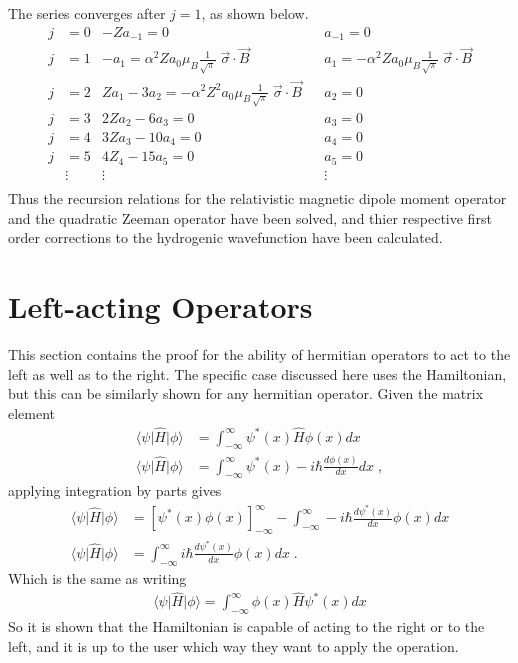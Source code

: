     \noindent The series converges after $j = 1$, as shown below.
    \begin{align*}
        j &= 0 & -Za_{-1} = 0& &a_{-1} = 0\\ \nonumber
        j &= 1 & -a_1 = \alpha^2 Z a_0 \mu_B  \frac{1}{\sqrt{\pi}}\; \vec{\sigma} \cdot \vec{B} & &a_{1} = - \alpha^2 Z a_0 \mu_B \frac{1}{\sqrt{\pi}}\; \vec{\sigma} \cdot \vec{B}\\ \nonumber
        j &= 2 & Za_1 - 3a_2 = - \alpha^2 Z^2 a_0 \mu_B \frac{1}{\sqrt{\pi}}\; \vec{\sigma} \cdot \vec{B} && a_2 = 0\\ \nonumber
        j &= 3 & 2Za_2 - 6a_3 = 0&& a_3 = 0\\ \nonumber
        j &= 4 & 3Za_3 - 10a_4 =0 && a_4 = 0\\ \nonumber
        j &= 5 & 4Z_4 - 15a_5 = 0 && a_5 = 0 \\ \nonumber
        & \vdots & \vdots && \vdots \\
    \end{align*}
    \noindent Thus the recursion relations for the relativistic magnetic dipole moment operator and the quadratic Zeeman operator have been solved, and thier respective first order corrections to the hydrogenic wavefunction have been calculated.

\chapter{Left-acting Operators} \label{sec:Hermitian_Left}
    This section contains the proof for the ability of hermitian operators to act to the left as well as to the right. The specific case discussed here uses the Hamiltonian, but this can be similarly shown for any hermitian operator. Given the matrix element
    \begin{align}
        \langle \psi \vert \hat{H} \vert \phi \rangle &= \int^\infty_{-\infty} \psi^*(x) \hat{H} \phi(x) dx\\
        \langle \psi \vert \hat{H} \vert \phi \rangle &= \int^\infty_{-\infty} \psi^*(x) -i\hbar\frac{d \phi(x)}{dx} dx\;,
    \end{align}
    \noindent applying integration by parts gives 
    \begin{align}
        \langle \psi \vert \hat{H} \vert \phi \rangle &= \left[\psi^*(x) \phi(x) \right]^\infty_{-\infty} - \int_{-\infty}^\infty -i\hbar \frac{d\psi^*(x)}{dx} \phi(x) dx\\
        \langle \psi \vert \hat{H} \vert \phi \rangle &= \int_{-\infty}^\infty i\hbar \frac{d\psi^*(x)}{dx} \phi(x) dx\;.
    \end{align}
    \noindent Which is the same as writing
    \begin{align}
        \langle \psi \vert \hat{H} \vert \phi \rangle = \int^\infty_{-\infty} \phi(x) \hat{H} \psi^*(x) dx
    \end{align}
    \noindent So it is shown that the Hamiltonian is capable of acting to the right or to the left, and it is up to the user which way they want to apply the operation.
